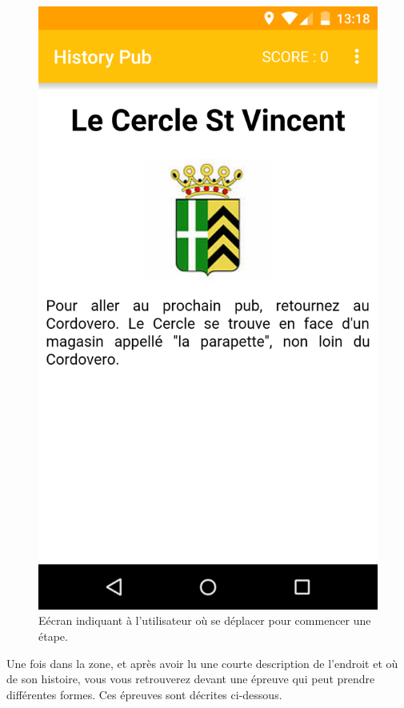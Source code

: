 \documentclass[11pt]{scrreprt}
\begin{document}
    \begin{figure}[H]
        \centering
        \includegraphics[scale=.15]{images/location.png}
        \caption{Eécran indiquant à l'utilisateur où se déplacer pour commencer une étape.}
    \end{figure}

    Une fois dans la zone, et après avoir lu une courte description de l'endroit et où de son histoire, vous vous retrouverez devant une épreuve qui peut prendre différentes formes. Ces épreuves sont décrites ci-dessous.
\end{document}
